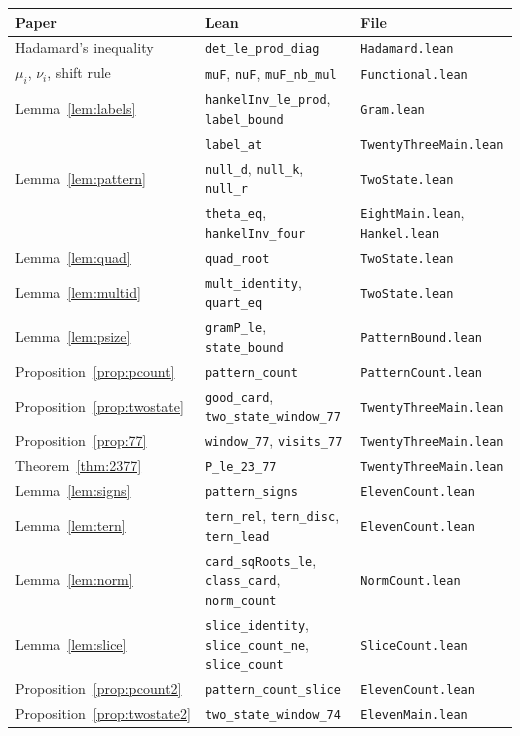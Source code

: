 \documentclass[11pt]{amsart}
\theoremstyle{definition}
\theoremstyle{remark}
\newcommand{\lean}[1]{\texttt{#1}}
\begin{document}
\begin{center}\footnotesize
\begin{tabular}{@{}lll@{}}
\toprule
Paper & Lean & File \\
\midrule
Hadamard's inequality & \lean{det\_le\_prod\_diag} & \lean{Hadamard.lean}\\
$\mu_i$, $\nu_i$, shift rule & \lean{muF}, \lean{nuF}, \lean{muF\_nb\_mul} & \lean{Functional.lean}\\
Lemma~\ref{lem:labels} & \lean{hankelInv\_le\_prod}, \lean{label\_bound} & \lean{Gram.lean}\\
 & \lean{label\_at} & \lean{TwentyThreeMain.lean}\\
Lemma~\ref{lem:pattern} & \lean{null\_d}, \lean{null\_k}, \lean{null\_r} & \lean{TwoState.lean}\\
 & \lean{theta\_eq}, \lean{hankelInv\_four} & \lean{EightMain.lean}, \lean{Hankel.lean}\\
Lemma~\ref{lem:quad} & \lean{quad\_root} & \lean{TwoState.lean}\\
Lemma~\ref{lem:multid} & \lean{mult\_identity}, \lean{quart\_eq} & \lean{TwoState.lean}\\
Lemma~\ref{lem:psize} & \lean{gramP\_le}, \lean{state\_bound} & \lean{PatternBound.lean}\\
Proposition~\ref{prop:pcount} & \lean{pattern\_count} & \lean{PatternCount.lean}\\
Proposition~\ref{prop:twostate} & \lean{good\_card}, \lean{two\_state\_window\_77} & \lean{TwentyThreeMain.lean}\\
Proposition~\ref{prop:77} & \lean{window\_77}, \lean{visits\_77} & \lean{TwentyThreeMain.lean}\\
Theorem~\ref{thm:2377} & \lean{P\_le\_23\_77} & \lean{TwentyThreeMain.lean}\\
Lemma~\ref{lem:signs} & \lean{pattern\_signs} & \lean{ElevenCount.lean}\\
Lemma~\ref{lem:tern} & \lean{tern\_rel}, \lean{tern\_disc}, \lean{tern\_lead} & \lean{ElevenCount.lean}\\
Lemma~\ref{lem:norm} & \lean{card\_sqRoots\_le}, \lean{class\_card}, \lean{norm\_count} & \lean{NormCount.lean}\\
Lemma~\ref{lem:slice} & \lean{slice\_identity}, \lean{slice\_count\_ne}, \lean{slice\_count} & \lean{SliceCount.lean}\\
Proposition~\ref{prop:pcount2} & \lean{pattern\_count\_slice} & \lean{ElevenCount.lean}\\
Proposition~\ref{prop:twostate2} & \lean{two\_state\_window\_74} & \lean{ElevenMain.lean}\\

\end{tabular}
\end{center}
\end{document}
